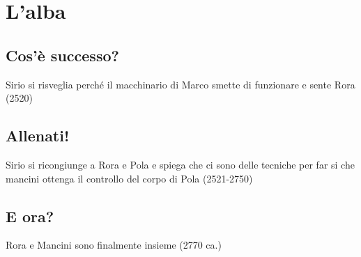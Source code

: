 
\chapter{L'alba}
\section{Cos'è successo?}
Sirio si risveglia perché il macchinario di Marco smette di funzionare e sente Rora (2520)

\section{Allenati!}
Sirio si ricongiunge a Rora e Pola e spiega che ci sono delle tecniche per far si che mancini ottenga il controllo del corpo di Pola
(2521-2750)
\section{E ora?}
Rora e Mancini sono finalmente insieme (2770 ca.) 
